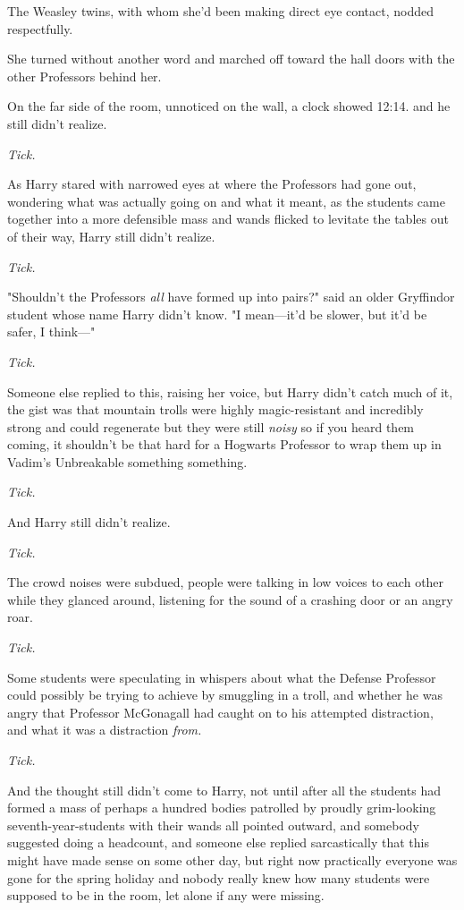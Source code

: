 The Weasley twins, with whom she'd been making direct eye contact, nodded
respectfully.

She turned without another word and marched off toward the hall doors with the
other Professors behind her.

On the far side of the room, unnoticed on the wall, a clock showed 12:14\PM.
\sbreak
{\el}and he still didn't realize.

\emph{Tick.}

As Harry stared with narrowed eyes at where the Professors had gone out,
wondering what was actually going on and what it meant, as the students came
together into a more defensible mass and wands flicked to levitate the tables
out of their way, Harry still didn't realize.

\emph{Tick.}

"Shouldn't the Professors \emph{all} have formed up into pairs?" said an older
Gryffindor student whose name Harry didn't know. "I mean—it'd be slower, but
it'd be safer, I think—"

\emph{Tick.}

Someone else replied to this, raising her voice, but Harry didn't catch much of
it, the gist was that mountain trolls were highly magic-resistant and
incredibly strong and could regenerate but they were still \emph{noisy} so if
you heard them coming, it shouldn't be that hard for a Hogwarts Professor to
wrap them up in Vadim's Unbreakable something something.

\emph{Tick.}

And Harry still didn't realize.

\emph{Tick.}

The crowd noises were subdued, people were talking in low voices to each other
while they glanced around, listening for the sound of a crashing door or an
angry roar.

\emph{Tick.}

Some students were speculating in whispers about what the Defense Professor
could possibly be trying to achieve by smuggling in a troll, and whether he was
angry that Professor McGonagall had caught on to his attempted distraction, and
what it was a distraction \emph{from.}

\emph{Tick.}

And the thought still didn't come to Harry, not until after all the students
had formed a mass of perhaps a hundred bodies patrolled by proudly grim-looking
seventh-year-students with their wands all pointed outward, and somebody
suggested doing a headcount, and someone else replied sarcastically that this
might have made sense on some other day, but right now practically everyone was
gone for the spring holiday and nobody really knew how many students were
supposed to be in the room, let alone if any were missing.

